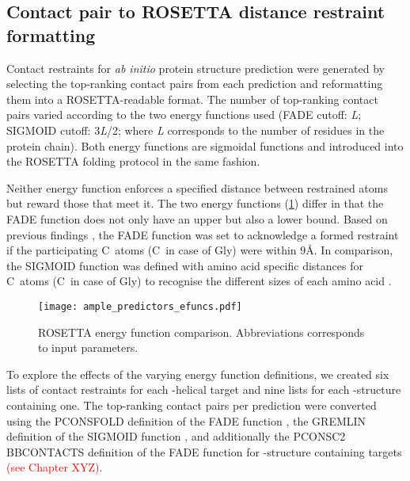 \subsection{Contact pair to ROSETTA distance restraint formatting}
Contact restraints for \textit{ab initio} protein structure prediction were generated by selecting the top­-ranking contact pairs from each prediction and reformatting them into a ROSETTA-readable format. The number of top-­ranking contact pairs varied according to the two energy functions used (FADE cutoff: \textit{L}; SIGMOID cutoff: 3\textit{L}/2; where \textit{L} corresponds to the number of residues in the protein chain). Both energy functions are sigmoidal functions and introduced into the ROSETTA folding protocol in the same fashion. 

Neither energy function enforces a specified distance between restrained atoms but reward those that meet it. The two energy functions (\cref{fig:ample_predictors_efuncs}) differ in that the FADE function does not only have an upper but also a lower bound. Based on previous findings \cite{Michel2014-ci, Skwark2014-mu}, the FADE function was set to acknowledge a formed restraint if the participating C\textbeta\ atoms (C\textalpha\ in case of Gly) were within 9\AA. In comparison, the SIGMOID function was defined with amino acid specific distances for C\textbeta\ atoms (C\textalpha\ in case of Gly) to recognise the different sizes of each amino acid \cite{Kamisetty2013-bs, Ovchinnikov2015-nt}.

\begin{figure}[H]
    \centering
    \texttt{[image: ample\_predictors\_efuncs.pdf]}
    \caption{ROSETTA energy function comparison. Abbreviations corresponds to input parameters.}
    \label{fig:ample_predictors_efuncs}
\end{figure}

To explore the effects of the varying energy function definitions, we created six lists of contact restraints for each \textalpha-helical target and nine lists for each \textbeta-structure containing one. The top-ranking contact pairs per prediction were converted using the PCONSFOLD definition of the FADE function \cite{Michel2014-ci}, the GREMLIN definition of the SIGMOID function \cite{Ovchinnikov2015-nt}, and additionally the PCONSC2 BBCONTACTS definition of the FADE function for \textbeta-structure containing targets \textcolor{red}{(see Chapter XYZ)}.

